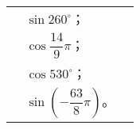 \begin{xiaotis}
\begin{xiaoxiaotis}
\end{xiaoxiaotis}

\begin{xiaoxiaotis}

    \renewcommand\arraystretch{1.5}
    \begin{tabular}[t]{*{3}{@{}p{13em}}}
         & $\sin 260^\circ$； \\
         & $\cos \dfrac{14}{9} \pi$； \\
         & $\cos 530^\circ$； \\
         & $\sin \left( -\dfrac{63}{8} \pi \right)$。
    \end{tabular}

\end{xiaoxiaotis}

\end{xiaotis}

